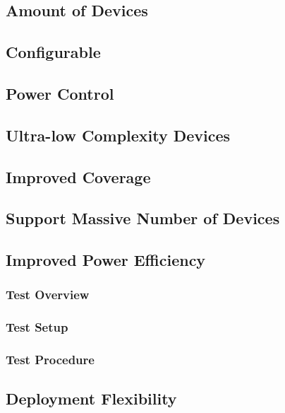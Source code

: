 \subsection{Amount of Devices}

\subsection{Configurable}

\subsection{Power Control}

\subsection{Ultra-low Complexity Devices}

\subsection{Improved Coverage}

\subsection{Support Massive Number of Devices}

\subsection{Improved Power Efficiency}
\subsubsection{Test Overview}
\subsubsection{Test Setup}
\subsubsection{Test Procedure}
\subsection{Deployment Flexibility}


